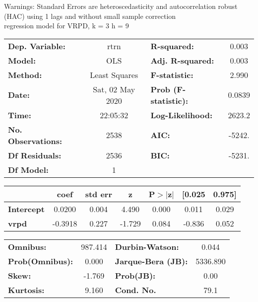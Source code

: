 Warnings: \newline
 [1] Standard Errors are heteroscedasticity and autocorrelation robust (HAC) using 1 lags and without small sample correction\\ 

regression model for VRPD, k = 3 h = 9\begin{center}
\begin{tabular}{lclc}
\toprule
\textbf{Dep. Variable:}    &       rtrn       & \textbf{  R-squared:         } &     0.003   \\
\textbf{Model:}            &       OLS        & \textbf{  Adj. R-squared:    } &     0.003   \\
\textbf{Method:}           &  Least Squares   & \textbf{  F-statistic:       } &     2.990   \\
\textbf{Date:}             & Sat, 02 May 2020 & \textbf{  Prob (F-statistic):} &   0.0839    \\
\textbf{Time:}             &     22:05:32     & \textbf{  Log-Likelihood:    } &    2623.2   \\
\textbf{No. Observations:} &        2538      & \textbf{  AIC:               } &    -5242.   \\
\textbf{Df Residuals:}     &        2536      & \textbf{  BIC:               } &    -5231.   \\
\textbf{Df Model:}         &           1      & \textbf{                     } &             \\
\bottomrule
\end{tabular}
\begin{tabular}{lcccccc}
                   & \textbf{coef} & \textbf{std err} & \textbf{z} & \textbf{P$> |$z$|$} & \textbf{[0.025} & \textbf{0.975]}  \\
\midrule
\textbf{Intercept} &       0.0200  &        0.004     &     4.490  &         0.000        &        0.011    &        0.029     \\
\textbf{vrpd}      &      -0.3918  &        0.227     &    -1.729  &         0.084        &       -0.836    &        0.052     \\
\bottomrule
\end{tabular}
\begin{tabular}{lclc}
\textbf{Omnibus:}       & 987.414 & \textbf{  Durbin-Watson:     } &    0.044  \\
\textbf{Prob(Omnibus):} &   0.000 & \textbf{  Jarque-Bera (JB):  } & 5336.890  \\
\textbf{Skew:}          &  -1.769 & \textbf{  Prob(JB):          } &     0.00  \\
\textbf{Kurtosis:}      &   9.160 & \textbf{  Cond. No.          } &     79.1  \\
\bottomrule
\end{tabular}
\end{center}

